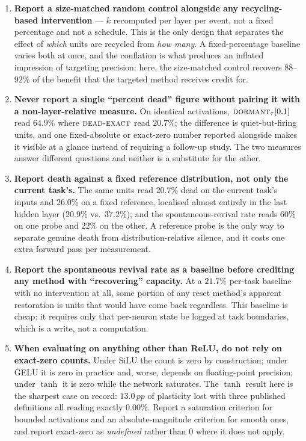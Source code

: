 \documentclass[10pt]{article}
\newcommand{\dexact}{\textsc{dead-exact}}
\newcommand{\ddorm}{\textsc{dormant}_\tau}
\newcommand{\pp}{\,pp}
\begin{document}
\begin{enumerate}
\item \textbf{Report a size-matched random control alongside any recycling-based
intervention} --- $k$ recomputed per layer per event, not a fixed percentage and
not a schedule. This is the only design that separates the effect of \emph{which}
units are recycled from \emph{how many}. A fixed-percentage baseline varies both
at once, and the conflation is what produces an inflated impression of targeting
precision: here, the size-matched control recovers $88$--$92\%$ of the benefit
that the targeted method receives credit for.

\item \textbf{Never report a single ``percent dead'' figure without pairing it
with a non-layer-relative measure.} On identical activations, $\ddorm[0.1]$ read
$64.9\%$ where $\dexact$ read $20.7\%$; the difference is quiet-but-firing units,
and one fixed-absolute or exact-zero number reported alongside makes it visible
at a glance instead of requiring a follow-up study. The two measures answer
different questions and neither is a substitute for the other.

\item \textbf{Report death against a fixed reference distribution, not only the
current task's.} The same units read $20.7\%$ dead on the current task's inputs
and $26.0\%$ on a fixed reference, localised almost entirely in the last hidden
layer ($20.9\%$ vs.\ $37.2\%$); and the spontaneous-revival rate reads $60\%$ on
one probe and $22\%$ on the other. A reference probe is the only way to separate
genuine death from distribution-relative silence, and it costs one extra forward
pass per measurement.

\item \textbf{Report the spontaneous revival rate as a baseline before crediting
any method with ``recovering'' capacity.} At a $21.7\%$ per-task baseline with no
intervention at all, some portion of any reset method's apparent restoration is
units that would have come back regardless. This baseline is cheap: it requires
only that per-neuron state be logged at task boundaries, which is a
write, not a computation.

\item \textbf{When evaluating on anything other than ReLU, do not rely on
exact-zero counts.} Under SiLU the count is zero by construction; under GELU it
is zero in practice and, worse, depends on floating-point precision; under
$\tanh$ it is zero while the network saturates. The $\tanh$ result here is the
sharpest case on record: $13.0\pp$ of plasticity lost with three published
definitions all reading exactly $0.00\%$. Report a saturation criterion for
bounded activations and an absolute-magnitude criterion for smooth ones, and
report exact-zero as \emph{undefined} rather than $0$ where it does not apply.
\end{enumerate}
\end{document}
